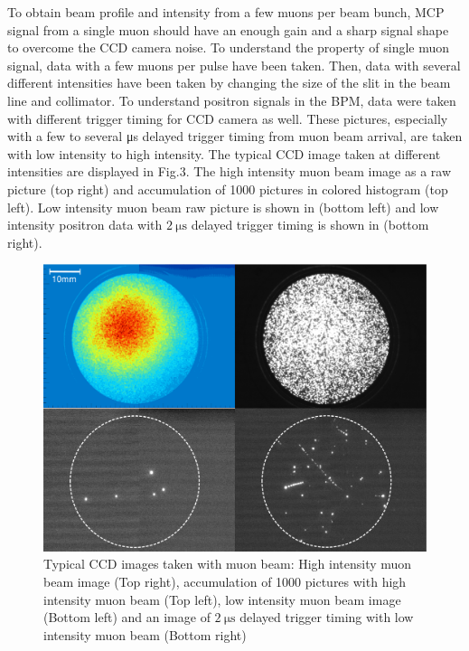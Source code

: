 \documentclass[preprint,3p,twocolumn]{elsarticle}
\begin{document}
To obtain beam profile and intensity from a few muons per beam bunch, MCP signal from a single muon should have an enough gain and a sharp signal shape to overcome the CCD camera noise.
To understand the property of single muon signal, data with a few muons per pulse have been taken. Then, data with several different intensities have been taken by changing the size of the slit in the beam line and collimator. To understand positron signals in the BPM, data were taken with different trigger timing for CCD camera as well. These pictures, especially with a few to several \si{\micro\s} delayed trigger timing from muon beam arrival, are taken with low intensity to high intensity.
The typical CCD image taken at different intensities are displayed in Fig.3. The high intensity muon beam image as a raw picture (top right) and accumulation of 1000 pictures in colored histogram (top left). Low intensity muon beam raw picture is shown in (bottom left) and low intensity positron data with $\SI{2}{\micro\s}$ delayed trigger timing is shown in (bottom right).
\begin{figure}[tbp]
	\centering
	\includegraphics[width=\columnwidth]{figure/fig3_v2.pdf}
	\caption{Typical CCD images taken with muon beam: High intensity muon beam image (Top right), accumulation of 1000 pictures with high intensity muon beam (Top left), low intensity muon beam image (Bottom left) and an image of $\SI{2}{\micro\s}$ delayed trigger timing with low intensity muon beam (Bottom right)
	}
	\vspace{-0.4cm}
	\label{fig:single_cluster}
\end{figure}
\end{document}
